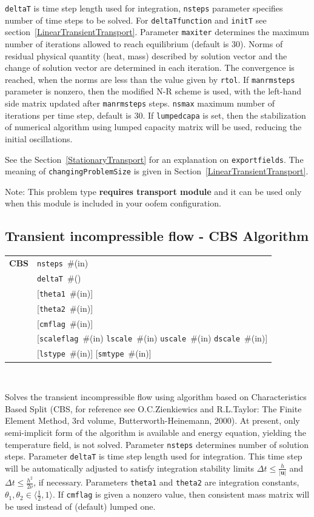 \documentclass[a4paper]{article}
\makeatletter
\newcommand{\mbf}[1]{\boldsymbol{#1}}
\newcommand{\param}[1]{\texttt{#1}} %
\newcommand{\optional}[1]{[#1]} %
\newcommand{\field}[2]{\param{#1}~\#{\tiny(#2)}} %
\newcommand{\optField}[2]{\optional{\field{#1}{#2}}}
\newcommand{\entKeywordInst}[1]{\textbf{#1}} %
\newenvironment{record}[1][]{\begin{tabular}{|ll}}{\end{tabular}\\}
\newcommand{\recentry}[2]{{#1}&{#2}\\}
\newcounter{rcc}
\newenvironment{record}[1][\textwidth]{\setcounter{rcc}{0}\begin{tabular*}{#1}{|ll@{\extracolsep{\fill}}r}}{\end{tabular*}\\}
\newcommand{\recentry}[2]{\ifthenelse{\value{rcc}>0}{&$\backslash$ \\}{\setcounter{rcc}{1}}{#1}&{#2}}
\makeatother
\begin{document}
\param{deltaT} is time step length used for integration, \param{nsteps} parameter specifies
number of time steps to be solved. For \param{deltaTfunction} and \param{initT} see section~\ref{LinearTransientTransport}.
Parameter \param{maxiter} determines the maximum
number of iterations allowed to reach equilibrium (default is 30). Norms of
residual physical quantity (heat, mass) described by solution vector and 
the change of solution vector are determined in each iteration.
The convergence is reached, when the norms are less than the value given by \param{rtol}.
If \param{manrmsteps} parameter is nonzero, then the modified
N-R scheme is used, with the left-hand side matrix updated after
\param{manrmsteps} steps.
\param{nsmax} maximum number of iterations per time step, default is 30.
If \param{lumpedcapa} is set, then the stabilization of numerical
algorithm using lumped capacity matrix will be used, reducing the
initial oscillations.

See the Section~\ref{StationaryTransport} for an explanation on
\param{exportfields}. The meaning 
of \param{changingProblemSize} is given in Section~\ref{LinearTransientTransport}.

Note: This problem type \textbf{requires transport module} and it
can be used only when this module is included in your oofem
configuration.

\subsection{Transient incompressible flow - CBS Algorithm}
\label{cbsIncomp}
\begin{record}
  \recentry{\entKeywordInst{CBS}}{\field{nsteps}{in}}
  \recentry{}{\field{deltaT}{}}
  \recentry{}{\optField{theta1}{in}}
  \recentry{}{\optField{theta2}{in}}
  \recentry{}{\optField{cmflag}{in}}
  \recentry{}{[\field{scaleflag}{in} \field{lscale}{in} \field{uscale}{in} \field{dscale}{in}]}
  \recentry{}{\optField{lstype}{in} \optField{smtype}{in}}
\end{record}

Solves the transient incompressible flow using algorithm based on
Characteristics Based Split (CBS, for reference see O.C.Zienkiewics
and R.L.Taylor: The Finite Element Method, 3rd volume,
Butterworth-Heinemann, 2000). At present, only semi-implicit form
of the algorithm is available and energy equation, yielding the
temperature field, is not solved.
Parameter \param{nsteps} determines number of solution
steps. Parameter \param{deltaT} is time step length used for
integration. This time step will be automatically adjusted to satisfy
integration stability limits $\Delta t \le {\frac{h}{\vert\mbf{u}\vert}}$ and $\Delta t \le {\frac{h^2}{2\nu}}$, if necessary.
Parameters \param{theta1} and \param{theta2} are integration constants, $\theta_1, \theta_2 \in \langle{\frac12}, 1\rangle$.
If \param{cmflag} is given a nonzero value, then
consistent mass matrix will be used instead of (default) lumped one.
\end{document}
